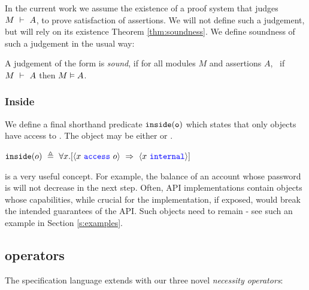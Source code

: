  
In the current work we assume the existence of a proof system that judges
$M\ \vdash\ A$, to prove  satisfaction of assertions. 
 We will not define such a judgement, but will rely on its existence  Theorem \ref{thm:soundness}.
We define soundness of such a judgement in the usual way:

\begin{definition}
\label{ax:specW-prove-soundness}
A judgement of the form  is \emph{sound}, if for all
 modules $M$ and assertions $A$, \ if $M\ \vdash\ A$ then $M \vDash A$.
\end{definition}

 
\subsubsection{Inside}

We define
a final shorthand 
predicate $\texttt{inside}( {\texttt{o}} )$ which states 
that only \internalO objects have access to .
The object  may be either \internalO or \externalO.
\begin{definition}[Inside]
$\wrapped{o}\ \triangleq\ \all{x}{\access{x}{o}\ \Rightarrow\ \internal{x}} $ 
\end{definition}

 
\inside is a very useful concept. For example, the balance of an account whose
  password is \inside  will not decrease in the next step.
  Often, API implementations contain objects whose capabilities, while  crucial for the implementation, if exposed,
would break the intended guarantees of the API. Such objects need to remain \inside - see
such an example in Section \ref{s:examples}. 
 


\subsection {\Nec operators}
\label{s:holistic-guarantees}

The \Nec specification language extends \SpecO with our three novel 
 \emph{necessity operators}:

